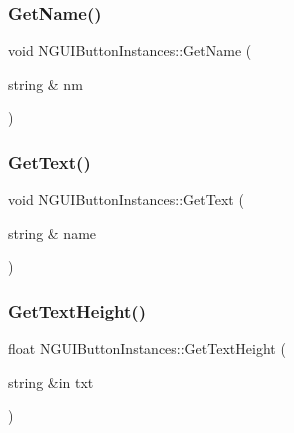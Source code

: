 \subsubsection{\texorpdfstring{Get\+Name()}{GetName()}}
{\footnotesize\ttfamily void N\+G\+U\+I\+Button\+Instances\+::\+Get\+Name (\begin{DoxyParamCaption}\item[{string \&}]{nm }\end{DoxyParamCaption})}

\hypertarget{class_n_g_u_i_button_instances_aef01520907a809d25171ea93ce9ab285}{}\label{class_n_g_u_i_button_instances_aef01520907a809d25171ea93ce9ab285} 
\subsubsection{\texorpdfstring{Get\+Text()}{GetText()}}
{\footnotesize\ttfamily void N\+G\+U\+I\+Button\+Instances\+::\+Get\+Text (\begin{DoxyParamCaption}\item[{string \&}]{name }\end{DoxyParamCaption})}

\hypertarget{class_n_g_u_i_button_instances_a62508eb8272eff3293294de8ce714f09}{}\label{class_n_g_u_i_button_instances_a62508eb8272eff3293294de8ce714f09} 
\subsubsection{\texorpdfstring{Get\+Text\+Height()}{GetTextHeight()}}
{\footnotesize\ttfamily float N\+G\+U\+I\+Button\+Instances\+::\+Get\+Text\+Height (\begin{DoxyParamCaption}\item[{string \&in}]{txt }\end{DoxyParamCaption})}

\hypertarget{class_n_g_u_i_button_instances_adddbd35059c42b755388f4c9a96762b8}{}\label{class_n_g_u_i_button_instances_adddbd35059c42b755388f4c9a96762b8} 
